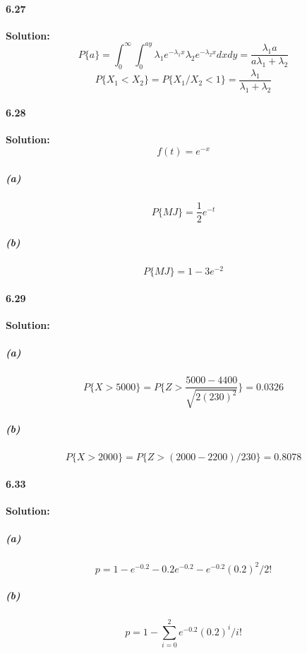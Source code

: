 \documentclass[11pt]{article}
\begin{document}
	\paragraph{6.27}\textbf{Solution:}
			\[P\{a\} = \int_0^{\infty}\int_0^{ay} \lambda_1e^{-\lambda_1x}\lambda_2e^{-\lambda_2x} dxdy = \frac{\lambda_1a}{a\lambda_1 + \lambda_2}\]
			\[P\{X_1 < X_2\} = P\{X_1 / X_2 < 1\} = \frac{\lambda_1}{\lambda_1 + \lambda_2}\]
	\paragraph{6.28}\textbf{Solution:}
		\[f(t) = e^{-x}\]
		\subparagraph{(a)}
			\[P\{MJ\} = \frac{1}{2}e^{-t}\]
		\subparagraph{(b)}
			\[P\{MJ\} = 1 - 3e^{-2}\]
	\paragraph{6.29}\textbf{Solution:}
		\subparagraph{(a)}
			\[P\{X > 5000\} = P\{Z > \frac{5000 - 4400}{\sqrt{2(230)^2}}\} = 0.0326\]
		\subparagraph{(b)}
			\[P\{X > 2000\} = P\{Z > (2000 - 2200)/230\} = 0.8078\]
		
	\paragraph{6.33}\textbf{Solution:}
		\subparagraph{(a)}
			\[p = 1 - e^{-0.2} - 0.2e^{-0.2} - e^{-0.2}(0.2)^2/2!\]
		\subparagraph{(b)}
			\[p = 1 - \sum_{i = 0}^2 e^{-0.2}(0.2)^i/i!\]
\end{document}
